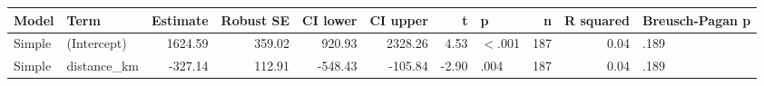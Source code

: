 \begingroup\footnotesize
\begin{tabular}{llrrrrrlrrl}
  \toprule
Model & Term & Estimate & Robust SE & CI lower & CI upper & t & p & n & R squared & Breusch-Pagan p \\ 
  \midrule
Simple & (Intercept) & 1624.59 & 359.02 & 920.93 & 2328.26 & 4.53 & $<$.001 & 187 & 0.04 & .189 \\ 
  Simple & distance\_km & -327.14 & 112.91 & -548.43 & -105.84 & -2.90 & .004 & 187 & 0.04 & .189 \\ 
   \bottomrule
\end{tabular}
\endgroup
